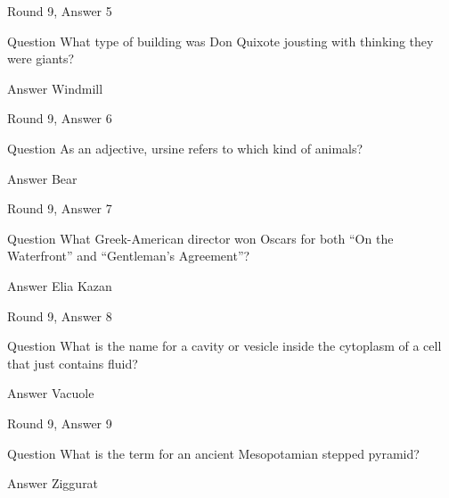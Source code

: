 \documentclass[11pt]{beamer}
\begin{document}
\begin{frame}[t]{Round 9, Answer 5}
\vspace{2em}
\begin{block}{Question}
What type of building was Don Quixote jousting with thinking they were giants\@?
\end{block}
\pause{}
\begin{block}{Answer}
Windmill
\end{block}
\end{frame}
    

\begin{frame}[t]{Round 9, Answer 6}
\vspace{2em}
\begin{block}{Question}
As an adjective, ursine refers to which kind of animals\@?
\end{block}
\pause{}
\begin{block}{Answer}
Bear
\end{block}
\end{frame}
    

\begin{frame}[t]{Round 9, Answer 7}
\vspace{2em}
\begin{block}{Question}
What Greek-American director won Oscars for both ``On the Waterfront'' and ``Gentleman's Agreement''\@?
\end{block}
\pause{}
\begin{block}{Answer}
Elia Kazan
\end{block}
\end{frame}
    

\begin{frame}[t]{Round 9, Answer 8}
\vspace{2em}
\begin{block}{Question}
What is the name for a cavity or vesicle inside the cytoplasm of a cell that just contains fluid\@?
\end{block}
\pause{}
\begin{block}{Answer}
Vacuole
\end{block}
\end{frame}
    

\begin{frame}[t]{Round 9, Answer 9}
\vspace{2em}
\begin{block}{Question}
What is the term for an ancient Mesopotamian stepped pyramid\@?
\end{block}
\pause{}
\begin{block}{Answer}
Ziggurat
\end{block}
\end{frame}
    
\end{document}
